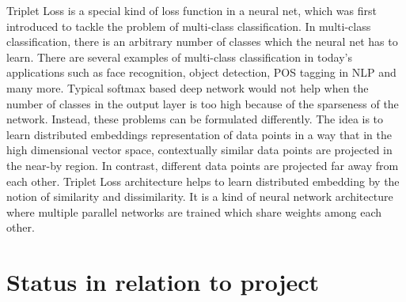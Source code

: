 Triplet Loss is a special kind of loss function in a neural net, which was first introduced to tackle the problem of multi-class classification. In multi-class classification, there is an arbitrary number of classes which the neural net has to learn. There are several examples of multi-class classification in today's applications such as face recognition, object detection, POS tagging in NLP and many more. Typical softmax based deep network would not help when the number of classes in the output layer is too high because of the sparseness of the network. Instead, these problems can be formulated differently.
\newline
\newline
The idea is to learn distributed embeddings representation of data points in a way that in the high dimensional vector space, contextually similar data points are projected in the near-by region. In contrast, different data points are projected far away from each other. 
\newline
\newline
Triplet Loss architecture helps to learn distributed embedding by the notion of similarity and dissimilarity. It is a kind of neural network architecture where multiple parallel networks are trained which share weights among each other.

\section{Status in relation to project}
\label{sec:Status-Relation-Project}
